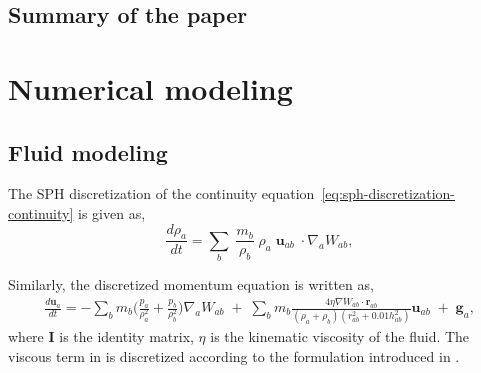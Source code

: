 \documentclass[preprint,12pt]{elsarticle}
\newcommand{\ten}[1]{\ensuremath{\mathbf{#1}}}
\begin{document}
\subsection*{Summary of the paper}





\FloatBarrier%
\section{Numerical modeling}


\subsection*{Fluid modeling}

The SPH discretization of the continuity
equation~\cref{eq:sph-discretization-continuity} is given as,
\begin{equation}
  \label{eq:sph-discretization-continuity}
  \frac{{d}\rho_a}{dt} = \sum_{b} \; \frac{m_b}{\rho_{b}} \;
  \rho_{a} \; {\ten{u}}_{ab} \; \cdot \nabla_{a} W_{ab},
\end{equation}

%
Similarly, the discretized momentum equation is written as,
\begin{multline}
  \label{eq:sph-momentum-fluid}
  \frac{{d}\ten{u}_{a}}{dt} = - \sum_{b} m_b
  \bigg(\frac{p_a}{\rho_a^2} + \frac{p_b}{\rho_b^2}\bigg)
  \nabla_{a} W_{ab}
 \;+\;
  \sum_{b} m_b \frac{4 \eta \nabla W_{ab}\cdot
    \ten{r}_{ab}}{(\rho_a + \rho_b) (r_{ab}^2 + 0.01 h_{ab}^2)} \ten{u}_{ab}  \;+\;
  \ten{g}_{a},
\end{multline}
where $\ten{I}$ is the identity matrix, $\eta$ is the kinematic viscosity of the
fluid. The viscous term in  is discretized according to the
formulation introduced in \cite{morris1997modeling}.
\end{document}
